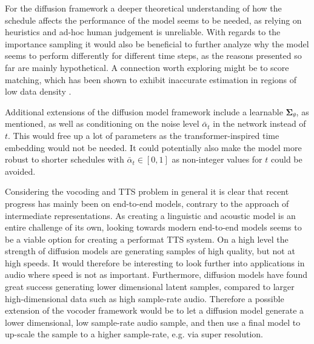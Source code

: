\documentclass{report}
\begin{document}
For the diffusion framework a deeper theoretical understanding of how the schedule affects the performance of the model seems to be needed, as relying on heuristics and ad-hoc human judgement is unreliable. With regards to the importance sampling it would also be beneficial to further analyze why the model seems to perform differently for different time steps, as the reasons presented so far are mainly hypothetical. A connection worth exploring might be to score matching, which has been shown to exhibit inaccurate estimation in regions of low data density \cite{song2019generative}. 

Additional extensions of the diffusion model framework include a learnable $\bm{\Sigma}_{\theta}$, as mentioned, as well as conditioning on the noise level $\bar{\alpha}_t$ in the network instead of $t$. This would free up a lot of parameters as the transformer-inspired time embedding would not be needed. It could potentially also make the model more robust to shorter schedules with $\bar{\alpha}_t \in [0, 1]$ as non-integer values for $t$ could be avoided.

Considering the vocoding and TTS problem in general it is clear that recent progress has mainly been on end-to-end models, contrary to the approach of intermediate representations. As creating a linguistic and acoustic model is an entire challenge of its own, looking towards modern end-to-end models seems to be a viable option for creating a performat TTS system. On a high level the strength of diffusion models are generating samples of high quality, but not at high speeds. It would therefore be interesting to look further into applications in audio where speed is not as important. Furthermore, diffusion models have found great success generating lower dimensional latent samples, compared to larger high-dimensional data such as high sample-rate audio. Therefore a possible extension of the vocoder framework would be to let a diffusion model generate a lower dimensional, low sample-rate audio sample, and then use a final model to up-scale the sample to a higher sample-rate, e.g. via super resolution.

\newpage



\end{document}

